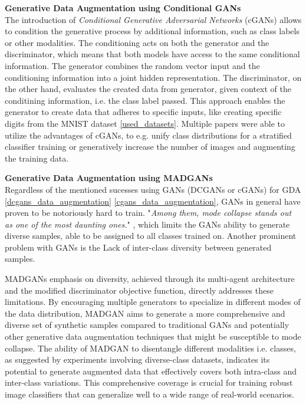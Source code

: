 \noindent\textbf{Generative Data Augmentation using Conditional GANs}\label{cgans_data_augmentation} \\
The introduction of \textit{Conditional Generative Adversarial Networks} (cGANs) \cite{mirza2014conditionalgenerativeadversarialnets} allows to condition the generative process by additional information, such as class labels or other modalities. The conditioning acts on both the generator and the discriminator, which means that both models have access to the same conditional information. The generator combines the random vector input and the conditioning information into a joint hidden representation. The discriminator, on the other hand, evaluates the created data from generator, given context of the conditining information, i.e. the class label passed. This approach enables the generator to create data that adheres to specific inputs, like creating specific digits from the MNIST dataset \ref{used_datasets}. Multiple papers were able to utilize the advantages of cGANs, to e.g. unify class distributions for a stratified classifier training or generatively increase the number of images and augmenting the training data\cite{jeong2022gan}\cite{zhao2023gan}\cite{cGANGDA2025asurveyreview}\cite{wickramaratne2021conditional}.

\noindent\textbf{Generative Data Augmentation using MADGANs}\label{madgans_data_augmentation} \\
Regardless of the mentioned sucesses using GANs (DCGANs or cGANs) for GDA \ref{dcgans_data_augmentation} \ref{cgans_data_augmentation}, GANs in general have proven to be notoriously hard to train. "\textit{Among them, mode collapse stands out as one of the most daunting ones.}" \cite{durall2020combatingmodecollapsegan}, which limits the GANs ability to generate diverse samples, able to be assigned to all classes trained on. Another prominent problem with GANs is the Lack of inter-class diversity between generated samples.

MADGANs \cite{ghosh2018madgan} emphasis on diversity, achieved through its multi-agent architecture and the modified discriminator objective function, directly addresses these limitations. By encouraging multiple generators to specialize in different modes of the data distribution, MADGAN aims to generate a more comprehensive and diverse set of synthetic samples compared to traditional GANs and potentially other generative data augmentation techniques that might be susceptible to mode collapse. The ability of MADGAN to disentangle different modalities i.e. classes, as suggested by experiments involving diverse-class datasets, indicates its potential to generate augmented data that effectively covers both intra-class and inter-class variations. This comprehensive coverage is crucial for training robust image classifiers that can generalize well to a wide range of real-world scenarios.

\newpage
